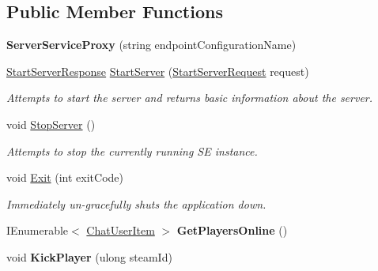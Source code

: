 \subsection*{Public Member Functions}
\begin{DoxyCompactItemize}
\item 
\hypertarget{class_s_e_server_g_u_i_1_1_server_service_proxy_a8ecb5d9e587925eeeb581c16fd6fb314}{}{\bfseries Server\+Service\+Proxy} (string endpoint\+Configuration\+Name)\label{class_s_e_server_g_u_i_1_1_server_service_proxy_a8ecb5d9e587925eeeb581c16fd6fb314}

\item 
\hyperlink{class_s_e_comm_1_1_start_server_response}{Start\+Server\+Response} \hyperlink{class_s_e_server_g_u_i_1_1_server_service_proxy_a95562f47e8f388a07190067367292e15}{Start\+Server} (\hyperlink{class_s_e_comm_1_1_start_server_request}{Start\+Server\+Request} request)
\begin{DoxyCompactList}\small\item\em Attempts to start the server and returns basic information about the server. \end{DoxyCompactList}\item 
void \hyperlink{class_s_e_server_g_u_i_1_1_server_service_proxy_a2e54e596eaa27b95e010b89a2f09be5d}{Stop\+Server} ()
\begin{DoxyCompactList}\small\item\em Attempts to stop the currently running S\+E instance. \end{DoxyCompactList}\item 
void \hyperlink{class_s_e_server_g_u_i_1_1_server_service_proxy_aecca063219e49d3b2ea6d93f74fc27c5}{Exit} (int exit\+Code)
\begin{DoxyCompactList}\small\item\em Immediately un-\/gracefully shuts the application down. \end{DoxyCompactList}\item 
\hypertarget{class_s_e_server_g_u_i_1_1_server_service_proxy_a5d1e94b15244218929051e167a107c0a}{}I\+Enumerable$<$ \hyperlink{class_s_e_mod_a_p_i_internal_1_1_chat_user_item}{Chat\+User\+Item} $>$ {\bfseries Get\+Players\+Online} ()\label{class_s_e_server_g_u_i_1_1_server_service_proxy_a5d1e94b15244218929051e167a107c0a}

\item 
\hypertarget{class_s_e_server_g_u_i_1_1_server_service_proxy_a823a570122109577a11de67948b5f275}{}void {\bfseries Kick\+Player} (ulong steam\+Id)\label{class_s_e_server_g_u_i_1_1_server_service_proxy_a823a570122109577a11de67948b5f275}


\end{DoxyCompactItemize}
